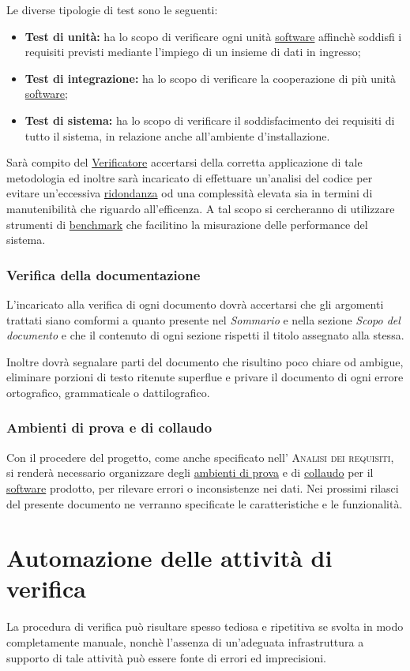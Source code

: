 \documentclass[11pt,a4paper]{article}
\begin{document}
Le diverse tipologie di test sono le seguenti:
\begin{itemize}
	\item \textbf{Test di unità:} ha lo scopo di verificare ogni unità \underline{software} affinchè soddisfi i requisiti previsti mediante l’impiego di un insieme di dati in ingresso;
	\item \textbf{Test di integrazione:} ha lo scopo di verificare la cooperazione di più unità \underline{software};
	\item \textbf{Test di sistema:} ha lo scopo di verificare il soddisfacimento dei requisiti di tutto il sistema, in relazione anche all'ambiente d'installazione.
\end{itemize}
Sarà compito del \underline{Verificatore} accertarsi della corretta applicazione di tale metodologia ed inoltre sarà incaricato di effettuare un'analisi del codice per evitare un'eccessiva \underline{ridondanza} od una complessità elevata sia in termini di manutenibilità che riguardo all'efficenza. A tal scopo si cercheranno di utilizzare strumenti di \underline{benchmark} che facilitino la misurazione delle performance del sistema.
\subsubsection{Verifica della documentazione}
L'incaricato alla verifica di ogni documento dovrà accertarsi che gli argomenti trattati siano comformi a quanto presente nel \textit{Sommario} e nella sezione \textit{Scopo del documento} e che il contenuto di ogni sezione rispetti il titolo assegnato alla stessa.

Inoltre dovrà segnalare parti del documento che risultino poco chiare od ambigue, eliminare porzioni di testo ritenute superflue e privare il documento di ogni errore ortografico, grammaticale o dattilografico. 
\subsubsection{Ambienti di prova e di collaudo}
Con il procedere del progetto, come anche specificato nell' \textsc{Analisi dei requisiti}, si renderà necessario organizzare degli \underline{ambienti di prova} e di \underline{collaudo} per il \underline{software} prodotto, per rilevare errori o inconsistenze nei dati. Nei prossimi rilasci del presente documento ne verranno specificate le caratteristiche e le funzionalità.
\section{Automazione delle attività di verifica}
La procedura di verifica può risultare spesso tediosa e ripetitiva se svolta in modo completamente manuale, nonchè l'assenza di un'adeguata infrastruttura a supporto di tale attività può essere fonte di errori ed imprecisioni.
\end{document}
